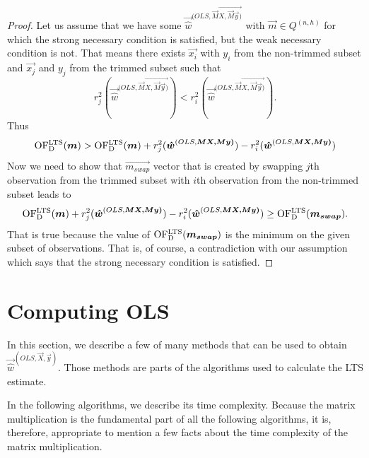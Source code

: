 \begin{proof}
		Let us assume that we have some $\vec{\hat{w}}^{(OLS,\vec{M}\vec{X, \vec{M}\vec{y})} }$ with $\vec{m} \in Q^{(n, h)}$ for which the strong necessary condition is satisfied, but the weak necessary condition is not. That means there exists $\vec{x_i}$ with $y_i$ from the non-trimmed subset and $\vec{x_j}$ and $y_j$ from the trimmed subset such that
		\begin{equation*} 
			r_j^2(\vec{\hat{w}}^{(OLS,\vec{M}\vec{X, \vec{M}\vec{y})} }) < r_i^2(\vec{\hat{w}}^{(OLS,\vec{M}\vec{X, \vec{M}\vec{y})} }).
	\end{equation*}
		 Thus 
    \begin{equation} 
        \operatorname{OF^{LTS}_D}(\boldsymbol{m}) > \operatorname{OF^{LTS}_D}(\boldsymbol{m}) + r_j^2(\boldsymbol{\hat{w}}^{(OLS,\boldsymbol{M}\boldsymbol{X, \boldsymbol{M}\boldsymbol{y})} }) - r_i^2(\boldsymbol{\hat{w}}^{(OLS,\boldsymbol{M}\boldsymbol{X, \boldsymbol{M}\boldsymbol{y})} })  
    \end{equation}
Now we need to show that $\vec{m_{swap}}$ vector that is created by swapping $j$th observation from the trimmed subset with $i$th observation from the non-trimmed subset leads to 
    \begin{equation} 
      \operatorname{OF^{LTS}_D}(\boldsymbol{m}) + r_j^2(\boldsymbol{\hat{w}}^{(OLS,\boldsymbol{M}\boldsymbol{X, \boldsymbol{M}\boldsymbol{y})} }) - r_i^2(\boldsymbol{\hat{w}}^{(OLS,\boldsymbol{M}\boldsymbol{X, \boldsymbol{M}\boldsymbol{y})} })  \geq \operatorname{OF^{LTS}_D}(\boldsymbol{m_{swap}}).
    \end{equation}
That is true because the value of $\operatorname{OF^{LTS}_D}(\boldsymbol{m_{swap}})$ is the minimum on the given subset of observations. That is, of course, a contradiction with our assumption which says that the strong necessary condition is satisfied. 
\end{proof}



\section{Computing OLS}
In this section, we describe a few of many methods that can be used to obtain  $\vec{\hat{w}}^{(OLS,\vec{X}, \vec{y})}$. Those methods are parts of the algorithms used to calculate the LTS estimate. 

In the following algorithms, we describe its time complexity. Because the matrix multiplication is the fundamental part of all the following algorithms, it is, therefore, appropriate to mention a few facts about the time complexity of the matrix multiplication. 

